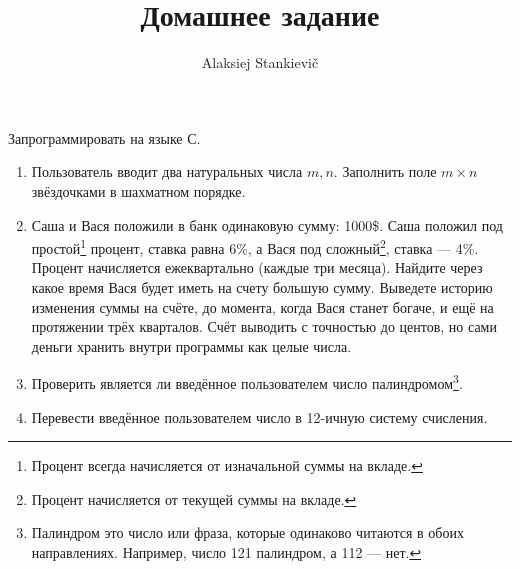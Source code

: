 \documentclass[12pt]{article}
\author{Alaksiej Stankievič}
\title{Домашнее задание}
\begin{document}


 Запрограммировать на языке С.
 \begin{enumerate}
  \item Пользователь вводит два натуральных числа $m, n$. Заполнить поле $m\times{}n$ звёздочками в шахматном порядке.
  \item Саша и Вася положили в банк одинаковую сумму: 1000\$. Саша положил под простой\footnote{Процент всегда 
  начисляется от изначальной суммы на вкладе.} процент, ставка равна 6\%, а Вася под сложный\footnote{Процент 
начисляется от текущей суммы на вкладе.}, ставка --- 4\%. Процент начисляется ежеквартально (каждые три месяца). Найдите 
через какое время Вася будет иметь на счету большую сумму. Выведете  историю изменения суммы на счёте, до момента, когда 
Вася станет богаче, и ещё на протяжении трёх кварталов. Счёт выводить с точностью до центов, но сами деньги хранить 
внутри программы как целые числа.
  \item Проверить является ли введённое пользователем число палиндромом\footnote{Палиндром это число или фраза, 
  которые одинаково читаются в обоих направлениях. Например, число 121 палиндром, а 112 --- нет.}.
  \item Перевести введённое пользователем число в 12-ичную систему счисления.
 \end{enumerate}
\end{document}
